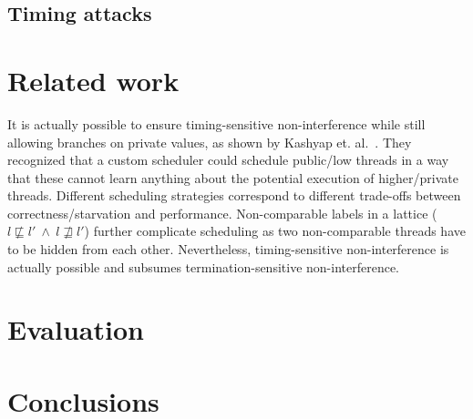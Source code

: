 \documentclass[10pt,preprint]{sigplanconf}
\begin{document}
\subsection{Timing attacks}



\section{Related work}

It is actually possible to ensure timing-sensitive non-interference while still allowing branches on private values, as shown by Kashyap et. al.~\cite{kashyap2011}.  They recognized that a custom scheduler could schedule public/low threads in a way that these cannot learn anything about the potential execution of higher/private threads.  Different scheduling strategies correspond to different trade-offs between correctness/starvation and performance.  Non-comparable labels in a lattice ($l \not \sqsubseteq l'~\wedge~l \not \sqsupseteq l'$) further complicate scheduling as two non-comparable threads have to be hidden from each other.  Nevertheless, timing-sensitive non-interference is actually possible and subsumes termination-sensitive non-interference.

\section{Evaluation}



\section{Conclusions}




\end{document}
